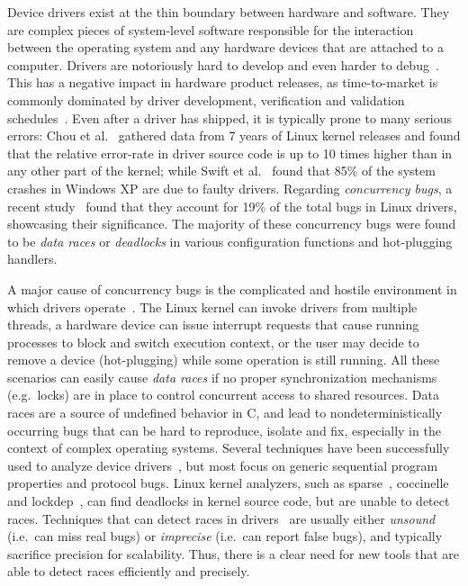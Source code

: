 Device drivers exist at the thin boundary between hardware and software. They are complex pieces of system-level software responsible for the interaction between the operating system and any hardware devices that are attached to a computer. Drivers are notoriously hard to develop and even harder to debug~\cite{corbet2005linux}. This has a negative impact in hardware product releases, as time-to-market is commonly dominated by driver development, verification and validation schedules~\cite{yavatkar2012era}.
%
Even after a driver has shipped, it is typically prone to many serious errors: Chou et al.~\cite{chou2001empirical} gathered data from 7 years of Linux kernel releases and found that the relative error-rate in driver source code is up to 10 times higher than in any other part of the kernel; while Swift et al.~\cite{Swift2003windowsxp} found that 85\% of the system crashes in Windows XP are due to faulty drivers. Regarding \emph{concurrency bugs}, a recent study~\cite{ryzhyk2009dingo} found that they account for 19\% of the total bugs in Linux drivers, showcasing their significance. The majority of these concurrency bugs were found to be \emph{data races} or \emph{deadlocks} in various configuration functions and hot-plugging handlers.

A major cause of concurrency bugs is the complicated and hostile environment in which drivers operate~\cite{corbet2005linux}. The Linux kernel can invoke drivers from multiple threads, a hardware device can issue interrupt requests that cause running processes to block and switch execution context, or the user may decide to remove a device (hot-plugging) while some operation is still running. All these scenarios can easily cause \emph{data races} if no proper synchronization mechanisms (e.g.\ locks) are in place to control concurrent access to shared resources.
%
Data races are a source of undefined behavior in C, and lead to nondeterministically occurring bugs that can be hard to reproduce, isolate and fix, especially in the context of complex operating systems.
%
Several techniques have been successfully used to analyze device drivers~\cite{ball2006thorough, clarke2004predicate, engler2000checking, henzinger2002temporal, cook2006termination, kuznetsov2010testing, renzelmann2012symdrive, lal2012corral}, but most focus on generic sequential program properties and protocol bugs. Linux kernel analyzers, such as sparse~\cite{corbet2004sparse}, coccinelle~\cite{padioleau2008doc} and lockdep~\cite{corbet2006lock}, can find deadlocks in kernel source code, but are unable to detect races. Techniques that can detect races in drivers~\cite{qadeer2004kiss, pratikakis2006locksmith, voung2007relay, lal2012corral} are usually either \emph{unsound} (i.e.\ can miss real bugs) or \emph{imprecise} (i.e.\ can report false bugs), and typically sacrifice precision for scalability. Thus, there is a clear need for new tools that are able to detect races efficiently and precisely.

